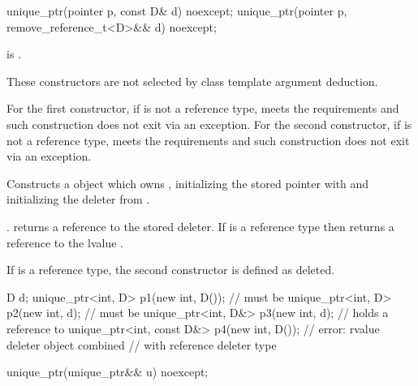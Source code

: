%
\begin{itemdecl}
unique_ptr(pointer p, const D& d) noexcept;
unique_ptr(pointer p, remove_reference_t<D>&& d) noexcept;
\end{itemdecl}

\begin{itemdescr}
\pnum
\constraints
{} is .

\pnum
\mandates
These constructors are not selected by
class template argument deduction.

\pnum
\expects
For the first constructor, if  is not a reference type,
 meets the  requirements and
such construction does not exit via an exception.
For the second constructor, if  is not a reference type,
 meets the  requirements and
such construction does not exit via an exception.

\pnum
\effects
Constructs a  object which owns , initializing
the stored pointer with  and initializing the deleter
from .

\pnum
\ensures
{}.
 returns a reference to the stored
deleter. If  is a reference type then 
returns a reference to the lvalue .

\pnum
\remarks
If  is a reference type,
the second constructor is defined as deleted.

\pnum
\begin{example}
\begin{codeblock}
D d;
unique_ptr<int, D> p1(new int, D());        //  must be 
unique_ptr<int, D> p2(new int, d);          //  must be 
unique_ptr<int, D&> p3(new int, d);         //  holds a reference to 
unique_ptr<int, const D&> p4(new int, D()); // error: rvalue deleter object combined
                                            // with reference deleter type
\end{codeblock}
\end{example}
\end{itemdescr}

%
\begin{itemdecl}
unique_ptr(unique_ptr&& u) noexcept;
\end{itemdecl}

